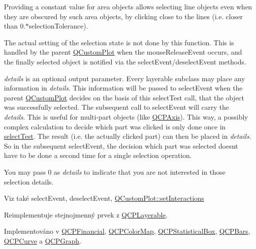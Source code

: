 Providing a constant value for area objects allows selecting line objects even when they are obscured by such area objects, by clicking close to the lines (i.\+e. closer than 0.$\ast$selection\+Tolerance).

The actual setting of the selection state is not done by this function. This is handled by the parent \hyperlink{classQCustomPlot}{Q\+Custom\+Plot} when the mouse\+Release\+Event occurs, and the finally selected object is notified via the select\+Event/deselect\+Event methods.

{\itshape details} is an optional output parameter. Every layerable subclass may place any information in {\itshape details}. This information will be passed to select\+Event when the parent \hyperlink{classQCustomPlot}{Q\+Custom\+Plot} decides on the basis of this select\+Test call, that the object was successfully selected. The subsequent call to select\+Event will carry the {\itshape details}. This is useful for multi-\/part objects (like \hyperlink{classQCPAxis}{Q\+C\+P\+Axis}). This way, a possibly complex calculation to decide which part was clicked is only done once in \hyperlink{classQCPAbstractPlottable_a1fc81aa273e9e8db84c1056bc0181fdb}{select\+Test}. The result (i.\+e. the actually clicked part) can then be placed in {\itshape details}. So in the subsequent select\+Event, the decision which part was selected doesn\textquotesingle{}t have to be done a second time for a single selection operation.

You may pass 0 as {\itshape details} to indicate that you are not interested in those selection details.

\begin{DoxySeeAlso}{Viz také}
select\+Event, deselect\+Event, \hyperlink{classQCustomPlot_a5ee1e2f6ae27419deca53e75907c27e5}{Q\+Custom\+Plot\+::set\+Interactions} 
\end{DoxySeeAlso}


Reimplementuje stejnojmenný prvek z \hyperlink{classQCPLayerable_a4001c4d0dfec55598efa4d531f2179a9}{Q\+C\+P\+Layerable}.



Implementováno v \hyperlink{classQCPFinancial_adf6cff00a55f775487d375fe4df5e95b}{Q\+C\+P\+Financial}, \hyperlink{classQCPColorMap_a4088dc7bcbe9bba605c84a912ba660ff}{Q\+C\+P\+Color\+Map}, \hyperlink{classQCPStatisticalBox_a7d3ac843dc48a085740fdfc4319a89cc}{Q\+C\+P\+Statistical\+Box}, \hyperlink{classQCPBars_a0d37a9feb1d0baf73ce6e809db214445}{Q\+C\+P\+Bars}, \hyperlink{classQCPCurve_a5af9949e725704811bbc81ecd5970b8e}{Q\+C\+P\+Curve} a \hyperlink{classQCPGraph_abc9ff375aabcf2d21cca33d6baf85772}{Q\+C\+P\+Graph}.

